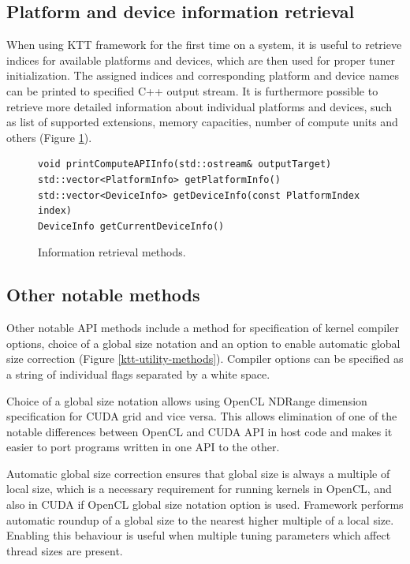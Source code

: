 \documentclass
[
    digital, %
    oneside, %
    table, %
    nolof, %
    nolot, %
    nocover %
]{fithesis3}
\begin{document}
\subsection{Platform and device information retrieval}
When using KTT framework for the first time on a system, it is useful to retrieve indices for available platforms and devices, which are then used for
proper tuner initialization. The assigned indices and corresponding platform and device names can be printed to specified C++ output stream. It is
furthermore possible to retrieve more detailed information about individual platforms and devices, such as list of supported extensions, memory
capacities, number of compute units and others (Figure \ref{ktt-information-methods}).

\begin{figure}
\begin{adjustwidth}{-1cm}{-1cm}
\begin{lstlisting}
void printComputeAPIInfo(std::ostream& outputTarget)
std::vector<PlatformInfo> getPlatformInfo()
std::vector<DeviceInfo> getDeviceInfo(const PlatformIndex index)
DeviceInfo getCurrentDeviceInfo()
\end{lstlisting}
\caption{Information retrieval methods.}
\label{ktt-information-methods}
\end{adjustwidth}
\end{figure}

\subsection{Other notable methods}
Other notable API methods include a method for specification of kernel compiler options, choice of a global size notation and an option to enable
automatic global size correction (Figure \ref{ktt-utility-methods}). Compiler options can be specified as a string of individual flags separated by
a white space.

Choice of a global size notation allows using OpenCL NDRange dimension specification for CUDA grid and vice versa. This allows elimination of one of
the notable differences between OpenCL and CUDA API in host code and makes it easier to port programs written in one API to the other.

Automatic global size correction ensures that global size is always a multiple of local size, which is a necessary requirement for running kernels
in OpenCL, and also in CUDA if OpenCL global size notation option is used. Framework performs automatic roundup of a global size to the nearest higher
multiple of a local size. Enabling this behaviour is useful when multiple tuning parameters which affect thread sizes are present.
\end{document}
